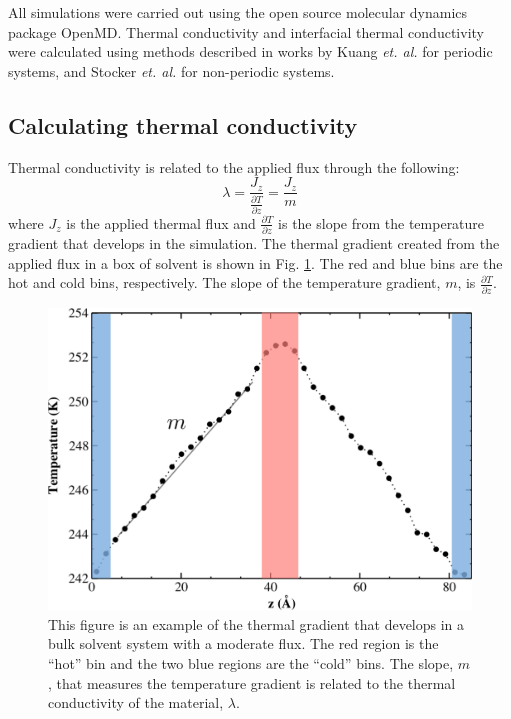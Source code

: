 All simulations were carried out using the open source molecular dynamics package OpenMD.\cite{openmd}
Thermal conductivity and interfacial thermal conductivity were calculated using methods described in works by Kuang \textit{et. al.} for periodic systems,\cite{Kuang:2011ef} and Stocker \textit{et. al.}  for non-periodic systems.\cite{Stocker:2014qq}

\subsection{Calculating thermal conductivity}
Thermal conductivity is related to the applied flux through the following:
\begin{equation}
    \lambda = \frac{J_z}{\frac{\partial T}{\partial z}} = \frac{J_z}{m}
\end{equation}
where $J_z$ is the applied thermal flux and $\frac{\partial T}{\partial z}$ is the slope from the temperature gradient that develops in the simulation.
The thermal gradient created from the applied flux in a box of solvent is shown in Fig. \ref{fig:lambda-grad}. The red and blue bins are the hot and cold bins, respectively.
The slope of the temperature gradient, $m$, is $\frac{\partial T}{\partial z}$.

\begin{figure}
    \includegraphics[scale=0.6]{figures/bulk-gradient.pdf}
    \caption{This figure is an example of the thermal gradient that develops in a bulk solvent system with a moderate flux. The red region is the ``hot'' bin and the two blue regions are the ``cold'' bins. The slope, $m$, that measures the temperature gradient is related to the thermal conductivity of the material, $\lambda$.}
    \label{fig:lambda-grad}
\end{figure}


